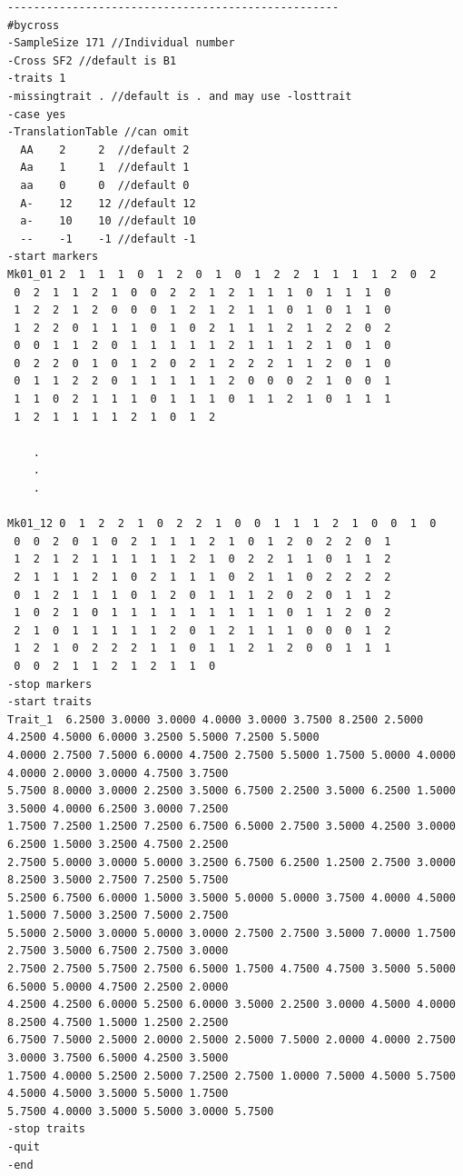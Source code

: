 {\scriptsize
\begin{verbatim}
---------------------------------------------------
#bycross
-SampleSize 171 //Individual number
-Cross SF2 //default is B1
-traits 1
-missingtrait . //default is . and may use -losttrait
-case yes
-TranslationTable //can omit
  AA    2     2  //default 2
  Aa    1     1  //default 1
  aa    0     0  //default 0
  A-    12    12 //default 12
  a-    10    10 //default 10
  --    -1    -1 //default -1
-start markers
Mk01_01 2  1  1  1  0  1  2  0  1  0  1  2  2  1  1  1  1  2  0  2 
 0  2  1  1  2  1  0  0  2  2  1  2  1  1  1  0  1  1  1  0 
 1  2  2  1  2  0  0  0  1  2  1  2  1  1  0  1  0  1  1  0 
 1  2  2  0  1  1  1  0  1  0  2  1  1  1  2  1  2  2  0  2 
 0  0  1  1  2  0  1  1  1  1  1  2  1  1  1  2  1  0  1  0 
 0  2  2  0  1  0  1  2  0  2  1  2  2  2  1  1  2  0  1  0 
 0  1  1  2  2  0  1  1  1  1  1  2  0  0  0  2  1  0  0  1 
 1  1  0  2  1  1  1  0  1  1  1  0  1  1  2  1  0  1  1  1 
 1  2  1  1  1  1  2  1  0  1  2 
    
    .
    .
    .

Mk01_12 0  1  2  2  1  0  2  2  1  0  0  1  1  1  2  1  0  0  1  0 
 0  0  2  0  1  0  2  1  1  1  2  1  0  1  2  0  2  2  0  1 
 1  2  1  2  1  1  1  1  1  2  1  0  2  2  1  1  0  1  1  2 
 2  1  1  1  2  1  0  2  1  1  1  0  2  1  1  0  2  2  2  2 
 0  1  2  1  1  1  0  1  2  0  1  1  1  2  0  2  0  1  1  2 
 1  0  2  1  0  1  1  1  1  1  1  1  1  1  0  1  1  2  0  2 
 2  1  0  1  1  1  1  1  2  0  1  2  1  1  1  0  0  0  1  2 
 1  2  1  0  2  2  2  1  1  0  1  1  2  1  2  0  0  1  1  1 
 0  0  2  1  1  2  1  2  1  1  0 
-stop markers
-start traits
Trait_1  6.2500 3.0000 3.0000 4.0000 3.0000 3.7500 8.2500 2.5000 4.2500 4.5000 6.0000 3.2500 5.5000 7.2500 5.5000 
4.0000 2.7500 7.5000 6.0000 4.7500 2.7500 5.5000 1.7500 5.0000 4.0000 4.0000 2.0000 3.0000 4.7500 3.7500 
5.7500 8.0000 3.0000 2.2500 3.5000 6.7500 2.2500 3.5000 6.2500 1.5000 3.5000 4.0000 6.2500 3.0000 7.2500 
1.7500 7.2500 1.2500 7.2500 6.7500 6.5000 2.7500 3.5000 4.2500 3.0000 6.2500 1.5000 3.2500 4.7500 2.2500 
2.7500 5.0000 3.0000 5.0000 3.2500 6.7500 6.2500 1.2500 2.7500 3.0000 8.2500 3.5000 2.7500 7.2500 5.7500 
5.2500 6.7500 6.0000 1.5000 3.5000 5.0000 5.0000 3.7500 4.0000 4.5000 1.5000 7.5000 3.2500 7.5000 2.7500 
5.5000 2.5000 3.0000 5.0000 3.0000 2.7500 2.7500 3.5000 7.0000 1.7500 2.7500 3.5000 6.7500 2.7500 3.0000 
2.7500 2.7500 5.7500 2.7500 6.5000 1.7500 4.7500 4.7500 3.5000 5.5000 6.5000 5.0000 4.7500 2.2500 2.0000 
4.2500 4.2500 6.0000 5.2500 6.0000 3.5000 2.2500 3.0000 4.5000 4.0000 8.2500 4.7500 1.5000 1.2500 2.2500 
6.7500 7.5000 2.5000 2.0000 2.5000 2.5000 7.5000 2.0000 4.0000 2.7500 3.0000 3.7500 6.5000 4.2500 3.5000 
1.7500 4.0000 5.2500 2.5000 7.2500 2.7500 1.0000 7.5000 4.5000 5.7500 4.5000 4.5000 3.5000 5.5000 1.7500 
5.7500 4.0000 3.5000 5.5000 3.0000 5.7500 
-stop traits
-quit
-end
\end{verbatim}
}

